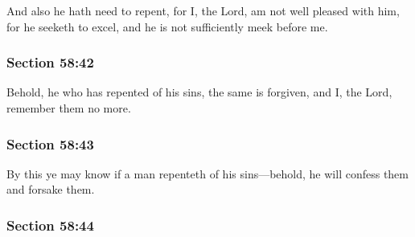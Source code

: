		And also he hath need to repent, for I, the Lord, am not well pleased with him, for he seeketh to excel, and he is not sufficiently meek before me.


	\subsubsection{Section 58:42} %
		\label{DC58-42}

		Behold, he who has repented of his sins, the same is forgiven, and I, the Lord, remember them no more.


	\subsubsection{Section 58:43} %
		\label{DC58-43}

		By this ye may know if a man repenteth of his sins---behold, he will confess them and forsake them.


	\subsubsection{Section 58:44} %
		\label{DC58-44}

